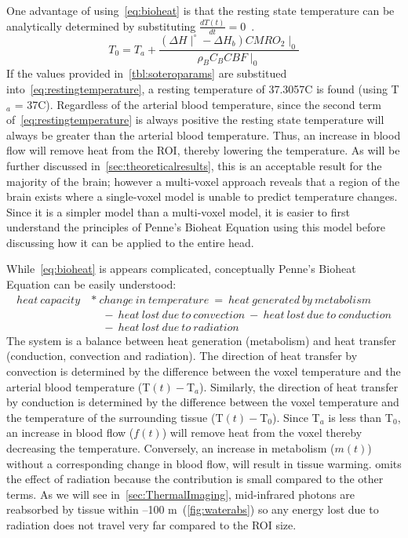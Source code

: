     One advantage of using~\cref{eq:bioheat} is that the resting state temperature can be analytically determined by substituting $\frac{dT(t)}{dt} = 0$~\citep{sotero2011}.
    \begin{equation}
      \label{eq:restingtemperature}
      T_{0} = T_{a} + \frac{(\Delta H \mid^{\circ} - \Delta H_{b}) CMRO_{2}\mid_{0}}{\rho_{B} C_{B} CBF\mid_{0}}
    \end{equation}
    If the values provided in~\cref{tbl:soteroparams} are substitued into~\cref{eq:restingtemperature}, a resting temperature of 37.3057\degree C is found (using T$_a$ = 37\degree C).  Regardless of the arterial blood temperature, since the second term of~\cref{eq:restingtemperature} is always positive the resting state temperature will always be greater than the arterial blood temperature. Thus, an increase in blood flow will remove heat from the ROI, thereby lowering the temperature. As will be further discussed in~\cref{sec:theoreticalresults}, this is an acceptable result for the majority of the brain; however a multi-voxel approach reveals that a region of the brain exists where a single-voxel model is unable to predict temperature changes.  Since it is a simpler model than a multi-voxel model, it is easier to first understand the principles of Penne's Bioheat Equation using this model before discussing how it can be applied to the entire head. 
    
    While~\cref{eq:bioheat} is appears complicated, conceptually Penne's Bioheat Equation can be easily understood:
    \begin{align}    
      \label{eq:soteroexplaiend}
      heat\ capacity\ &*\ change\ in\ temperature\ =\ heat\ generated\ by\ metabolism\nonumber \\ 
      &\quad {} -\ heat\ lost\ due\ to\ convection\ -\ heat\ lost\ due\ to\ conduction\nonumber\\ 
      &\quad {}  -\ heat\ lost\ due\ to\ radiation\
    \end{align}
    The system is a balance between heat generation (metabolism) and heat transfer (conduction, convection and radiation).  The direction of heat transfer by convection is determined by the difference between the voxel temperature and the arterial blood temperature (T$(t) - $T$_a$).  Similarly, the direction of heat transfer by conduction is determined by the difference between the voxel temperature and the temperature of the surrounding tissue (T$(t) - $T$_0$).  Since T$_a$ is less than T$_0$, an increase in blood flow ($f(t)$) will remove heat from the voxel thereby decreasing the temperature.  Conversely, an increase in metabolism ($m(t)$) without a corresponding change in blood flow, will result in tissue warming.   omits the effect of radiation because the contribution is small compared to the other terms.  As we will see in~\cref{sec:ThermalImaging}, mid-infrared photons are reabsorbed by tissue within --100 \textmu m~(\cref{fig:waterabs}) so any energy lost due to radiation does not travel very far compared to the ROI size.
    
